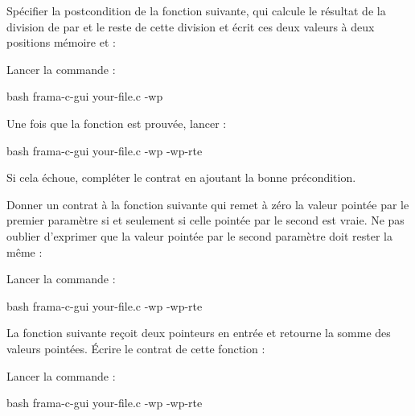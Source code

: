 



Spécifier la postcondition de la fonction suivante, qui calcule le résultat
de la division de  par  et le reste de cette
division et écrit ces deux valeurs à deux positions mémoire 
et  :




Lancer la commande :


\begin{CodeBlock}{bash}
frama-c-gui your-file.c -wp
\end{CodeBlock}


Une fois que la fonction est prouvée, lancer :

\begin{CodeBlock}{bash}
frama-c-gui your-file.c -wp -wp-rte
\end{CodeBlock}


Si cela échoue, compléter le contrat en ajoutant la bonne précondition.






Donner un contrat à la fonction suivante qui remet à zéro la valeur
pointée par le premier paramètre si et seulement si celle pointée par le
second est vraie. Ne pas oublier d'exprimer que la valeur pointée par le second
paramètre doit rester la même :




Lancer la commande :


\begin{CodeBlock}{bash}
frama-c-gui your-file.c -wp -wp-rte
\end{CodeBlock}






La fonction suivante reçoit deux pointeurs en entrée et retourne la
somme des valeurs pointées. Écrire le contrat de cette fonction :




Lancer la commande :


\begin{CodeBlock}{bash}
frama-c-gui your-file.c -wp -wp-rte
\end{CodeBlock}


